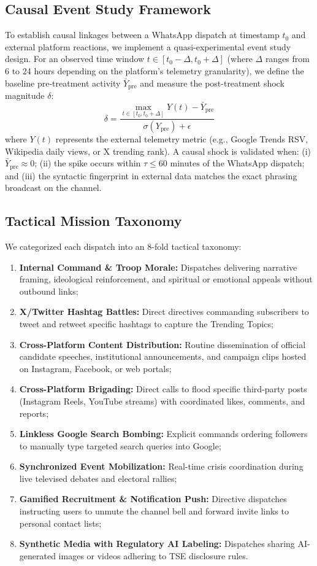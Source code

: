 \documentclass[preprint,12pt]{elsarticle}
\begin{document}
\subsection{Causal Event Study Framework}
To establish causal linkages between a WhatsApp dispatch at timestamp $t_0$ and external platform reactions, we implement a quasi-experimental event study design. For an observed time window $t \in [t_0 - \Delta, t_0 + \Delta]$ (where $\Delta$ ranges from 6 to 24 hours depending on the platform's telemetry granularity), we define the baseline pre-treatment activity $\bar{Y}_{\text{pre}}$ and measure the post-treatment shock magnitude $\delta$:
\begin{equation}
\delta = \frac{\max_{t \in [t_0, t_0 + \Delta]} Y(t) - \bar{Y}_{\text{pre}}}{\sigma(Y_{\text{pre}}) + \epsilon}
\end{equation}
where $Y(t)$ represents the external telemetry metric (e.g., Google Trends RSV, Wikipedia daily views, or X trending rank). A causal shock is validated when: (i) $\bar{Y}_{\text{pre}} \approx 0$; (ii) the spike occurs within $\tau \le 60\text{ minutes}$ of the WhatsApp dispatch; and (iii) the syntactic fingerprint in external data matches the exact phrasing broadcast on the channel.

\subsection{Tactical Mission Taxonomy}
We categorized each dispatch into an 8-fold tactical taxonomy:
\begin{enumerate}
    \item \textbf{Internal Command \& Troop Morale:} Dispatches delivering narrative framing, ideological reinforcement, and spiritual or emotional appeals without outbound links;
    \item \textbf{X/Twitter Hashtag Battles:} Direct directives commanding subscribers to tweet and retweet specific hashtags to capture the Trending Topics;
    \item \textbf{Cross-Platform Content Distribution:} Routine dissemination of official candidate speeches, institutional announcements, and campaign clips hosted on Instagram, Facebook, or web portals;
    \item \textbf{Cross-Platform Brigading:} Direct calls to flood specific third-party posts (Instagram Reels, YouTube streams) with coordinated likes, comments, and reports;
    \item \textbf{Linkless Google Search Bombing:} Explicit commands ordering followers to manually type targeted search queries into Google;
    \item \textbf{Synchronized Event Mobilization:} Real-time crisis coordination during live televised debates and electoral rallies;
    \item \textbf{Gamified Recruitment \& Notification Push:} Directive dispatches instructing users to unmute the channel bell and forward invite links to personal contact lists;
    \item \textbf{Synthetic Media with Regulatory AI Labeling:} Dispatches sharing AI-generated images or videos adhering to TSE disclosure rules.
\end{enumerate}
\end{document}
